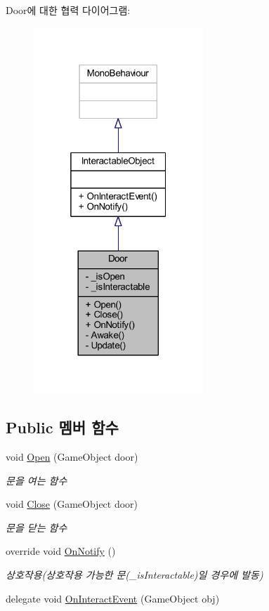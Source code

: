 Door에 대한 협력 다이어그램\+:
\nopagebreak
\begin{figure}[H]
\begin{center}
\leavevmode
\includegraphics[width=181pt]{dc/ddf/class_door__coll__graph}
\end{center}
\end{figure}
\subsection*{Public 멤버 함수}
\begin{DoxyCompactItemize}
\item 
void \mbox{\hyperlink{class_door_a31b8ff949e85dddb2585afa106fa5d05}{Open}} (Game\+Object door)
\begin{DoxyCompactList}\small\item\em 문을 여는 함수 \end{DoxyCompactList}\item 
void \mbox{\hyperlink{class_door_aa7d854b8fb1c977551051f03cea151ce}{Close}} (Game\+Object door)
\begin{DoxyCompactList}\small\item\em 문을 닫는 함수 \end{DoxyCompactList}\item 
override void \mbox{\hyperlink{class_door_a12cc0e80dc33ddd336dccc52466c2c50}{On\+Notify}} ()
\begin{DoxyCompactList}\small\item\em 상호작용(상호작용 가능한 문(\+\_\+is\+Interactable)일 경우에 발동) \end{DoxyCompactList}\item 
delegate void \mbox{\hyperlink{class_interactable_object_a70a579e4b09d53e6cb77b5222189d5eb}{On\+Interact\+Event}} (Game\+Object obj)
\end{DoxyCompactItemize}
